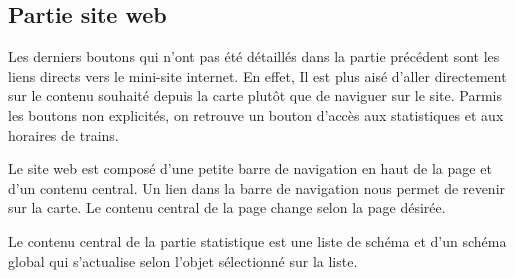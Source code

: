 \subsection{Partie site web}


Les derniers boutons qui n'ont pas été détaillés dans la partie précédent sont les liens directs vers le mini-site internet. En effet, Il est plus aisé d'aller directement sur le contenu souhaité depuis la carte plutôt que de naviguer sur le site. Parmis les boutons non explicités, on retrouve un bouton d'accès aux statistiques et aux horaires de trains.



Le site web est composé d'une petite barre de navigation en haut de la page et d'un contenu central. Un lien dans la barre de navigation nous permet de revenir sur la carte. Le contenu central de la page change selon la page désirée. 

Le contenu central de la partie statistique est une liste de schéma et d'un schéma global qui s'actualise selon l'objet sélectionné sur la liste.



